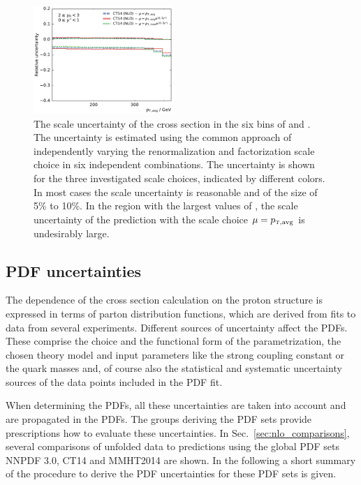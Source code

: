 \begin{figure}[htp]
    \includegraphics[width=0.47\textwidth]{figures/theory/scale_uncert_comp_yb2ys0.pdf}
    \caption[Scale uncertainties of NLO calculation]{The scale uncertainty of
        the cross section in the six bins of \ystar and
        \yboost. The uncertainty is estimated using the common approach of
        independently varying the renormalization and factorization scale choice
        in six independent combinations. The uncertainty is shown for the three
        investigated scale choices, indicated by different colors. In most cases
        the scale uncertainty is reasonable and of the size of 5\% to 10\%. In
        the region with the largest values of \ystar, the scale uncertainty of
        the prediction with the scale choice $\mu=\ptavg$ is undesirably large.}
    \label{fig:scale_uncertainties}
\end{figure}

\subsection{PDF uncertainties}
\label{sec:pdf_uncertainties}

The dependence of the cross section calculation on the proton structure is
expressed in terms of parton distribution functions, which are derived from fits
to data from several experiments. Different sources of uncertainty affect the
PDFs. These comprise the choice and the functional form of the parametrization,
the chosen theory model and input parameters like the strong coupling constant
\as or the quark masses and, of course also the statistical and systematic
uncertainty sources of the data points included in the PDF fit.

When determining the PDFs, all these uncertainties are taken into account and
are propagated in the PDFs. The groups deriving the PDF sets provide
prescriptions how to evaluate these uncertainties. In
Sec.~\ref{sec:nlo_comparisons}, several comparisons of unfolded data to
predictions using the global PDF sets NNPDF 3.0, CT14 and MMHT2014 are shown. In
the following a short summary of the procedure to derive the PDF uncertainties
for these PDF sets is given.

